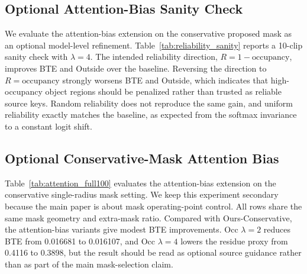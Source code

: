 \documentclass[nouppercase]{kaia}
\begin{document}
\subsection{Optional Attention-Bias Sanity Check}
We evaluate the attention-bias extension on the conservative proposed mask as an optional model-level refinement. Table~\ref{tab:reliability_sanity} reports a 10-clip sanity check with $\lambda=4$. The intended reliability direction, $R=1-\mathrm{occupancy}$, improves BTE and Outside over the baseline. Reversing the direction to $R=\mathrm{occupancy}$ strongly worsens BTE and Outside, which indicates that high-occupancy object regions should be penalized rather than trusted as reliable source keys. Random reliability does not reproduce the same gain, and uniform reliability exactly matches the baseline, as expected from the softmax invariance to a constant logit shift.

\begin{table}[h]
\begin{center}
\end{center}
\caption{Reliability-bias sanity check on 10 AI-Hub clips. The baseline denotes the corresponding preprocessing-only output on the 10-clip attention sanity subset. The useful direction is $R=1-\mathrm{occupancy}$; reversing the direction hurts BTE and Outside, random reliability is inconsistent, and uniform reliability reduces to the baseline.}
\label{tab:reliability_sanity}
\end{table}

\subsection{Optional Conservative-Mask Attention Bias}
Table~\ref{tab:attention_full100} evaluates the attention-bias extension on the conservative single-radius mask setting. We keep this experiment secondary because the main paper is about mask operating-point control. All rows share the same mask geometry and extra-mask ratio. Compared with Ours-Conservative, the attention-bias variants give modest BTE improvements. Occ $\lambda=2$ reduces BTE from 0.016681 to 0.016107, and Occ $\lambda=4$ lowers the residue proxy from 0.4116 to 0.3898, but the result should be read as optional source guidance rather than as part of the main mask-selection claim.
\end{document}
